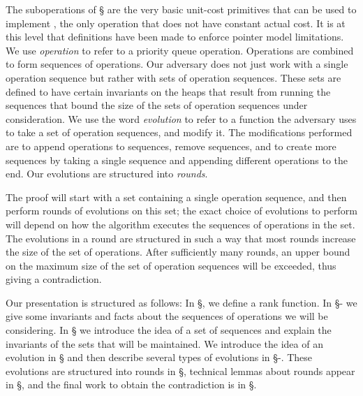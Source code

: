  The suboperations of \S{} are the very basic unit-cost primitives that can be used to implement \opEm, the only operation that does not have constant actual cost. It is at this level that definitions have been made to enforce pointer model limitations.
 We use \emph{operation} to refer to a priority queue operation. 
 Operations are combined to form sequences of operations. 
 Our adversary does not just work with a single operation sequence but rather with sets of operation sequences. These sets are defined to have certain invariants on the heaps that result from running the sequences that bound the size of the sets of operation sequences under consideration.
 We use the word \emph{evolution} to refer to a function the adversary uses to take a set of operation sequences, and modify it. The modifications performed are to append operations to sequences, remove sequences, and to create more sequences by taking a single sequence and appending different operations to the end.
 Our evolutions are structured into \emph{rounds}.

\begin{fullonly}
\end{description}
\end{fullonly}

The proof will start with a set containing a single operation sequence, and then perform rounds of evolutions on this set; the exact choice of evolutions to perform will depend on how the algorithm executes the sequences of operations in the set. The evolutions in a round are structured in such a way that most rounds increase the size of the set of operations. After sufficiently many rounds, an upper bound on the maximum size of the set of operation sequences will be exceeded, thus giving a contradiction.

Our presentation is structured as follows: 
In \S{}, we define a rank function.
In \S{}- we give some invariants and facts about the sequences of operations we will be considering.
In \S{} we introduce the idea of a set of sequences and explain the invariants of the sets that will be maintained.
We introduce the idea of an evolution in \S{} and then describe several types of evolutions in \S{}-. 
These evolutions are structured into rounds in \S{}, technical lemmas about rounds appear in \S{}, and the final work to obtain the contradiction is in \S{}.


